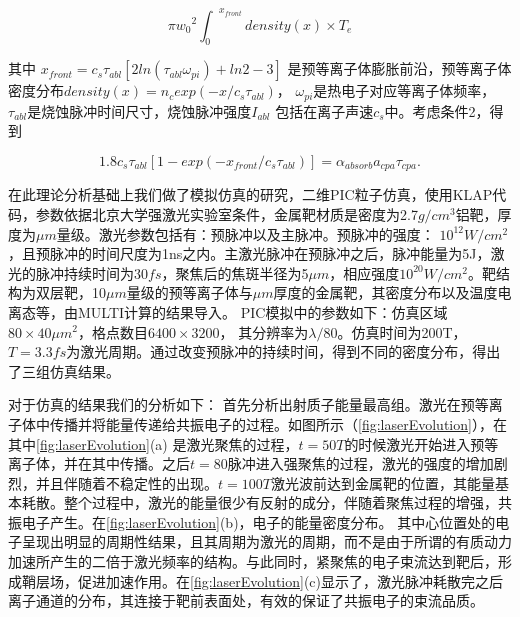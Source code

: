 \begin{equation}
\label{eqn:energyOsilationElectron}
 \pi {w_0}^2 {{\int}_{0}}^{x_{front}} density(x) \times T_e
\end{equation}

其中 $x_{front}=c_s {\tau}_{abl}[2ln({\tau}_{abl} {\omega}_{pi})+ln2-3]$\cite{mora2003plasma}    是预等离子体膨胀前沿，预等离子体密度分布$density(x)=n_c exp(-x/{c_s{\tau}_{abl}})$， ${\omega}_{pi}$是热电子对应等离子体频率， ${\tau}_{abl}$是烧蚀脉冲时间尺寸，烧蚀脉冲强度$I_{abl}$ 包括在离子声速$c_s$中。考虑条件2，得到



\begin{equation}
\label{eqn:OptimalCondition}
{1.8} c_s {\tau}_{abl}[1-exp(-x_{front}/{c_s{\tau}_{abl}})] 
 = {\alpha}_{absorb} a_{cpa} \tau_{cpa}.
\end{equation}







在此理论分析基础上我们做了模拟仿真的研究，二维PIC粒子仿真，使用KLAP代码，参数依据北京大学强激光实验室条件，金属靶材质是密度为2.7$g/cm^3$铝靶，厚度为$\mu m$量级。激光参数包括有：预脉冲以及主脉冲。预脉冲的强度： $10^12W/cm^2$，且预脉冲的时间尺度为1ns之内。主激光脉冲在预脉冲之后，脉冲能量为5J，激光的脉冲持续时间为$30fs$，聚焦后的焦斑半径为5$\mu m$，相应强度$10^20W/cm^2$。靶结构为双层靶，10$\mu  m$量级的预等离子体与$\mu m$厚度的金属靶，其密度分布以及温度电离态等，由MULTI计算的结果导入。 PIC模拟中的参数如下：仿真区域$80 \times 40 \mu m^2$，格点数目$6400 \times 3200$， 其分辨率为$\lambda / 80$。仿真时间为200T， $T=3.3fs$为激光周期。通过改变预脉冲的持续时间，得到不同的密度分布，得出了三组仿真结果。



对于仿真的结果我们的分析如下：
首先分析出射质子能量最高组。激光在预等离子体中传播并将能量传递给共振电子的过程。如图所示（\ref{fig:laserEvolution}），在其中\ref{fig:laserEvolution}(a) 是激光聚焦的过程，$t=50T$的时候激光开始进入预等离子体，并在其中传播。之后$t=80$脉冲进入强聚焦的过程，激光的强度的增加剧烈，并且伴随着不稳定性的出现。$t=100T$激光波前达到金属靶的位置，其能量基本耗散。整个过程中，激光的能量很少有反射的成分，伴随着聚焦过程的增强，共振电子产生。在\ref{fig:laserEvolution}(b)，电子的能量密度分布。 其中心位置处的电子呈现出明显的周期性结果，且其周期为激光的周期，而不是由于所谓的有质动力加速所产生的二倍于激光频率的结构。与此同时，紧聚焦的电子束流达到靶后，形成鞘层场，促进加速作用。在\ref{fig:laserEvolution}(c)显示了，激光脉冲耗散完之后离子通道的分布，其连接于靶前表面处，有效的保证了共振电子的束流品质。


